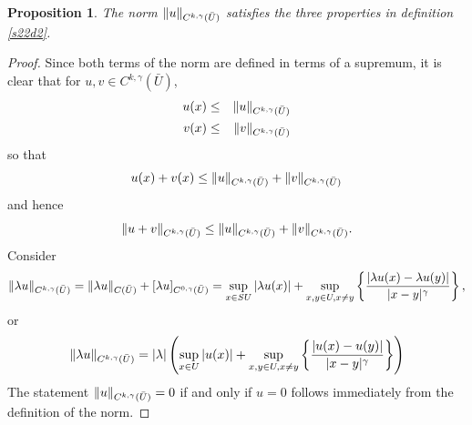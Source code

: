 \documentclass{article}
\DeclarePairedDelimiter\norm{\lVert}{\rVert}
\theoremstyle{plain}
\numberwithin{thm}{section}
\theoremstyle{plain}
\newtheorem{prop}{Proposition}
\numberwithin{prop}{section}
\theoremstyle{definition}
\numberwithin{defn}{section}
\theoremstyle{remark}
\numberwithin{equation}{section}
\begin{document}
\begin{prop}\label{s22p3}
The norm $\norm{u}_{C^{k, \gamma}(\bar{U})}$ satisfies the three properties in definition \ref{s22d2}.
\end{prop}
\begin{proof}
Since both terms of the norm are defined in terms of a supremum, it is clear that for $u, v \in 
C^{k, \gamma}(\bar{U})$,
\begin{eqnarray*}
u(x) &\le& \norm{u}_{C^{k, \gamma}(\bar{U})} \\
v(x) &\le& \norm{v}_{C^{k, \gamma}(\bar{U})}
\end{eqnarray*}
so that
\[
u(x) + v(x) \le \norm{u}_{C^{k, \gamma}(\bar{U})} + \norm{v}_{C^{k, \gamma}(\bar{U})}
\]
and hence
\[
\norm{u+v}_{C^{k, \gamma}(\bar{U})} \le \norm{u}_{C^{k, \gamma}(\bar{U})} + 
\norm{v}_{C^{k, \gamma}(\bar{U})}.
\]
Consider
\[
\norm{\lambda u}_{C^{k, \gamma}(\bar{U})} = \norm{\lambda u}_{C(\bar{U})} + 
[\lambda u]_{C^{0, \gamma}(\bar{U})} = \sup_{x\in SU}|\lambda u(x)| +
\sup_{x, y \in U, x \ne y}\left\{\frac{|\lambda u(x) - \lambda u(y)|}{|x - y|^\gamma}\right\}, 
\]
or
\[
\norm{\lambda u}_{C^{k, \gamma}(\bar{U})} = |\lambda|
\left(\sup_{x \in U}|u(x)| + \sup_{x, y \in U, x \ne y}\left\{\frac{|u(x) - u(y)|}{|x - y|^\gamma} \right\}\right) 
\]
The statement $\norm{u}_{C^{k, \gamma}(\bar{U})} = 0$ if and only if $u = 0$ follows immediately from the
definition of the norm.
\end{proof}
\end{document}
